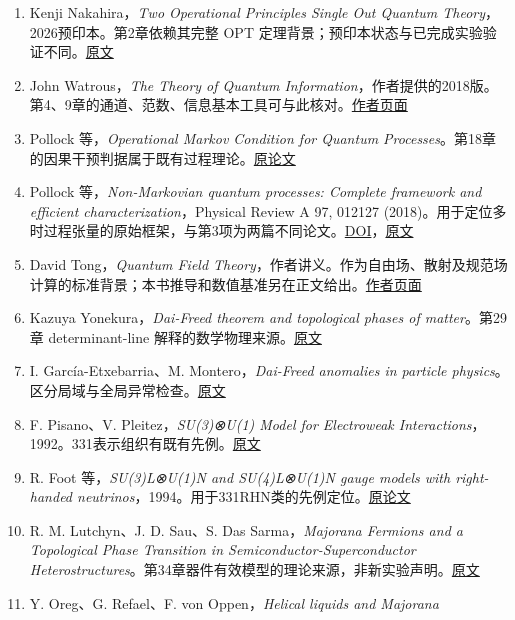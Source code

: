 \documentclass[
  11pt,
  oneside]{book}
\begin{document}
\begin{enumerate}
\def\labelenumi{\arabic{enumi}.}
\item
  Kenji Nakahira，\emph{Two Operational Principles Single Out Quantum
  Theory}，2026预印本。第2章依赖其完整 OPT
  定理背景；预印本状态与已完成实验验证不同。\href{https://arxiv.org/abs/2605.23217}{原文}
\item
  John Watrous，\emph{The Theory of Quantum
  Information}，作者提供的2018版。第4、9章的通道、范数、信息基本工具可与此核对。\href{https://cs.uwaterloo.ca/~watrous/TQI/}{作者页面}
\item
  Pollock 等，\emph{Operational Markov Condition for Quantum
  Processes}。第18章的因果干预判据属于既有过程理论。\href{https://link.aps.org/doi/10.1103/PhysRevLett.120.040405}{原论文}
\item
  Pollock 等，\emph{Non-Markovian quantum processes: Complete framework
  and efficient characterization}，Physical Review A 97, 012127
  (2018)。用于定位多时过程张量的原始框架，与第3项为两篇不同论文。\href{https://doi.org/10.1103/PhysRevA.97.012127}{DOI}，\href{https://arxiv.org/abs/1512.00589}{原文}
\item
  David Tong，\emph{Quantum Field
  Theory}，作者讲义。作为自由场、散射及规范场计算的标准背景；本书推导和数值基准另在正文给出。\href{https://www.damtp.cam.ac.uk/user/tong/qft.htm}{作者页面}
\item
  Kazuya Yonekura，\emph{Dai-Freed theorem and topological phases of
  matter}。第29章 determinant-line
  解释的数学物理来源。\href{https://arxiv.org/abs/1607.01873}{原文}
\item
  I. García-Etxebarria、M. Montero，\emph{Dai-Freed anomalies in
  particle
  physics}。区分局域与全局异常检查。\href{https://arxiv.org/abs/1808.00009}{原文}
\item
  F. Pisano、V. Pleitez，\emph{SU(3)⊗U(1) Model for Electroweak
  Interactions}，1992。331表示组织有既有先例。\href{https://arxiv.org/abs/hep-ph/9206242}{原文}
\item
  R. Foot 等，\emph{SU(3)L⊗U(1)N and SU(4)L⊗U(1)N gauge models with
  right-handed
  neutrinos}，1994。用于331RHN类的先例定位。\href{https://link.aps.org/doi/10.1103/PhysRevD.50.R34}{原论文}
\item
  R. M. Lutchyn、J. D. Sau、S. Das Sarma，\emph{Majorana Fermions and a
  Topological Phase Transition in Semiconductor-Superconductor
  Heterostructures}。第34章器件有效模型的理论来源，非新实验声明。\href{https://arxiv.org/abs/1002.4033}{原文}
\item
  Y. Oreg、G. Refael、F. von Oppen，\emph{Helical liquids and Majorana
}
\end{enumerate}
\end{document}
